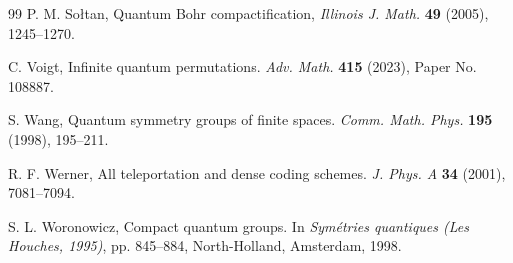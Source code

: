 \documentclass[a4paper]{amsart}
\numberwithin{equation}{section}
\theoremstyle{change}
\begin{document}
\begin{thebibliography}{99}
P. M. So{\l}tan, Quantum {B}ohr compactification,
\emph{Illinois J. Math.} \textbf{49} (2005), 1245--1270. 

C. Voigt, Infinite quantum permutations. 
\emph{Adv. Math.} \textbf{415} (2023), Paper No. 108887. 

S. Wang, Quantum symmetry groups of finite spaces. 
\emph{Comm. Math. Phys.} \textbf{195} (1998), 195--211. 

R. F. Werner, All teleportation and dense coding schemes. 
\emph{J. Phys. A} \textbf{34} (2001), 7081--7094. 

S. L. Woronowicz, Compact quantum groups. 
In \emph{Sym\'etries quantiques ({L}es {H}ouches, 1995)}, pp. 845--884, North-Holland, Amsterdam, 1998. 


\end{thebibliography}
\end{document}
